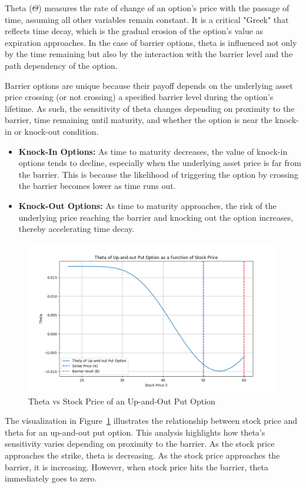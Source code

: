 Theta (\(\Theta\)) measures the rate of change of an option's price with the passage of time, assuming all other variables remain constant. It is a critical "Greek" that reflects time decay, which is the gradual erosion of the option's value as expiration approaches. In the case of barrier options, theta is influenced not only by the time remaining but also by the interaction with the barrier level and the path dependency of the option.

Barrier options are unique because their payoff depends on the underlying asset price crossing (or not crossing) a specified barrier level during the option's lifetime. As such, the sensitivity of theta changes depending on proximity to the barrier, time remaining until maturity, and whether the option is near the knock-in or knock-out condition.

\begin{itemize}
    \item \textbf{Knock-In Options:} As time to maturity decreases, the value of knock-in options tends to decline, especially when the underlying asset price is far from the barrier. This is because the likelihood of triggering the option by crossing the barrier becomes lower as time runs out.
    
    \item \textbf{Knock-Out Options:} As time to maturity approaches, the risk of the underlying price reaching the barrier and knocking out the option increases, thereby accelerating time decay.
\end{itemize}


\begin{figure}[H]
    \centering
    \includegraphics[width=.65\linewidth]{content/images/theta.png}
    \caption{Theta vs Stock Price of an Up-and-Out Put Option}
    \label{fig:theta_behavior}
\end{figure}


The visualization in Figure~\ref{fig:theta_behavior} illustrates the relationship between stock price and theta for an up-and-out put option. This analysis highlights how theta's sensitivity varies depending on proximity to the barrier. As the stock price approaches the strike, theta is decreasing. As the stock price approaches the barrier, it is increasing. However, when stock price hits the barrier, theta immediately goes to zero.


